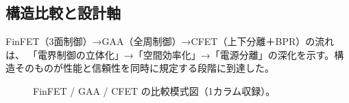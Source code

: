\subsection{構造比較と設計軸}
FinFET（3面制御）→GAA（全周制御）→CFET（上下分離＋BPR）の流れは、
「電界制御の立体化」→「空間効率化」→「電源分離」の深化を示す。構造そのものが性能と信頼性を同時に規定する段階に到達した。

\begin{figure}[t]
  \centering
  
  \caption{FinFET / GAA / CFET の比較模式図（1カラム収録）。}
  \label{fig:structure_compare_in_ch2}
\end{figure}
